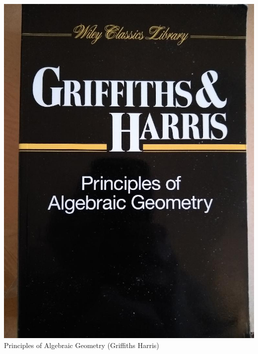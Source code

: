 \documentclass[t]{beamer}
\newcommand{\htarget}[2]{\hypertarget{#1}{#2}}
\begin{document}
\begin{frame}\htarget{AG}{}\begin{center}
\includegraphics[height=0.8\textheight]{Principles_of_Algebraic_Geometry_Griffiths_Harris_mini.jpg} \\
Principles of Algebraic Geometry (Griffiths Harris) 
\end{center} \end{frame}
\end{document}
